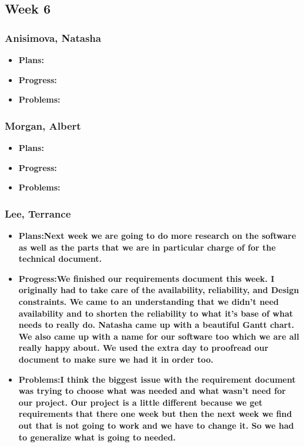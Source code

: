 \documentclass[10pt,draftclsnofoot,onecolumn]{IEEEtran}
\begin{document}
\subsection{Week 6}
\subsubsection{Anisimova, Natasha}
\begin{itemize}
	\item \textbf{Plans:}
	\item \textbf{Progress:}
	\item \textbf{Problems:}
\end{itemize}
\subsubsection{Morgan, Albert}
\begin{itemize}
	\item \textbf{Plans:}
	\item \textbf{Progress:}
	\item \textbf{Problems:}
\end{itemize}
\subsubsection{Lee, Terrance}
\begin{itemize}
	\item \textbf{Plans:Next week we are going to do more research on the software as well as the parts that we are in particular charge of for the technical document.}
	\item \textbf{Progress:We finished our requirements document this week. I originally had to take care of the availability, reliability, and Design constraints. We came to an understanding that we didn’t need availability and to shorten the reliability to what it’s base of what needs to really do. Natasha came up with a beautiful Gantt chart. We also came up with a name for our software too which we are all really happy about. We used the extra day to proofread our document to make sure we had it in order too.}
	\item \textbf{Problems:I think the biggest issue with the requirement document was trying to choose what was needed and what wasn’t need for our project. Our project is a little different because we get requirements that there one week but then the next week we find out that is not going to work and we have to change it. So we had to generalize what is going to needed.}
\end{itemize}
\end{document}
